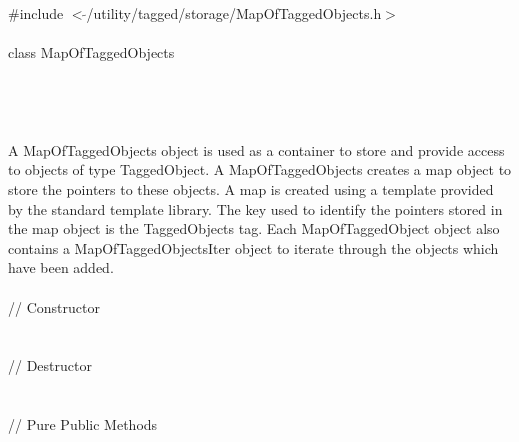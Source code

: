 
   \\
\indent \#include $<\tilde{ }$/utility/tagged/storage/MapOfTaggedObjects.h$>$ \\

  \\
\indent class MapOfTaggedObjects  \\

 \\
 \\
\indent{} \\

  \\
\indent A MapOfTaggedObjects object is used as a container to store and
provide access to objects of type TaggedObject. A MapOfTaggedObjects
creates a map object to store the pointers to these objects. A map is
created using a template provided by the standard template
library. The key used to identify the pointers stored in the map
object is the TaggedObjects tag. Each MapOfTaggedObject object also contains
a MapOfTaggedObjectsIter object to iterate through the objects which
have been added.\\ 

  \\
\indent // Constructor  \\
 \\\\
\indent // Destructor \\
 \\  \\
\indent // Pure Public Methods \\
\\
\\
\\
\\
\\
\\
\\
\\
\\

